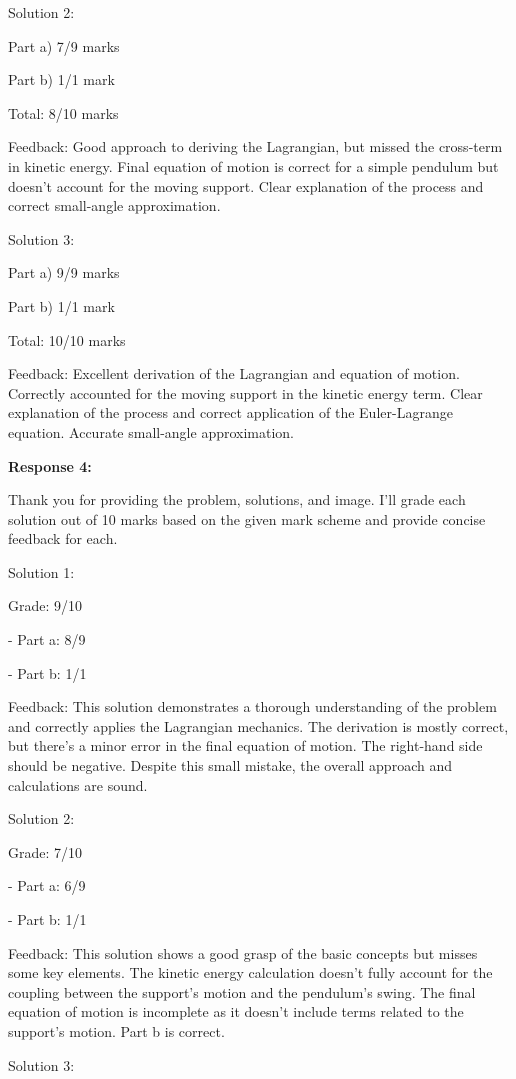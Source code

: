 \documentclass[a4paper,11pt]{article}
\begin{document}
Solution 2:

Part a) 7/9 marks

Part b) 1/1 mark

Total: 8/10 marks

Feedback: Good approach to deriving the Lagrangian, but missed the cross-term in kinetic energy. Final equation of motion is correct for a simple pendulum but doesn't account for the moving support. Clear explanation of the process and correct small-angle approximation.

Solution 3:

Part a) 9/9 marks

Part b) 1/1 mark

Total: 10/10 marks

Feedback: Excellent derivation of the Lagrangian and equation of motion. Correctly accounted for the moving support in the kinetic energy term. Clear explanation of the process and correct application of the Euler-Lagrange equation. Accurate small-angle approximation.

\bigskip
\textbf{Response 4:}

Thank you for providing the problem, solutions, and image. I'll grade each solution out of 10 marks based on the given mark scheme and provide concise feedback for each.

Solution 1:

Grade: 9/10

- Part a: 8/9

- Part b: 1/1

Feedback: This solution demonstrates a thorough understanding of the problem and correctly applies the Lagrangian mechanics. The derivation is mostly correct, but there's a minor error in the final equation of motion. The right-hand side should be negative. Despite this small mistake, the overall approach and calculations are sound.

Solution 2:

Grade: 7/10

- Part a: 6/9

- Part b: 1/1

Feedback: This solution shows a good grasp of the basic concepts but misses some key elements. The kinetic energy calculation doesn't fully account for the coupling between the support's motion and the pendulum's swing. The final equation of motion is incomplete as it doesn't include terms related to the support's motion. Part b is correct.

Solution 3:
\end{document}
